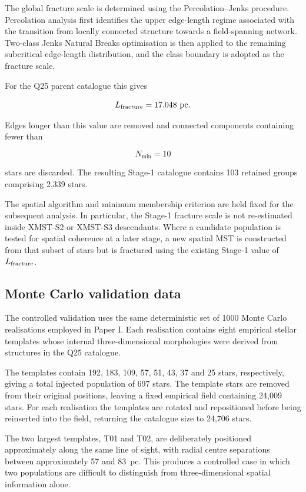 \documentclass[fleqn,usenatbib]{rasti}
\begin{document}
The global fracture scale is determined using the Percolation--Jenks
procedure. Percolation analysis first identifies the upper edge-length
regime associated with the transition from locally connected structure
towards a field-spanning network. Two-class Jenks Natural Breaks
optimisation is then applied to the remaining subcritical edge-length
distribution, and the class boundary is adopted as the fracture scale.

For the Q25 parent catalogue this gives

\[
L_{\rm fracture}=17.048~{\rm pc}.
\]

Edges longer than this value are removed and connected components containing
fewer than

\[
N_{\min}=10
\]

stars are discarded. The resulting Stage-1 catalogue contains 103 retained
groups comprising 2,339 stars.

The spatial algorithm and minimum membership criterion are held fixed for
the subsequent analysis. In particular, the Stage-1 fracture scale is not
re-estimated inside XMST-S2 or XMST-S3 descendants. Where a candidate
population is tested for spatial coherence at a later stage, a new spatial
MST is constructed from that subset of stars but is fractured using the
existing Stage-1 value of $L_{\rm fracture}$.


\subsection{Monte Carlo validation data}

The controlled validation uses the same deterministic set of 1000 Monte
Carlo realisations employed in Paper I. Each realisation contains eight
empirical stellar templates whose internal three-dimensional morphologies
were derived from structures in the Q25 catalogue.

The templates contain 192, 183, 109, 57, 51, 43, 37 and 25 stars,
respectively, giving a total injected population of 697 stars. The template
stars are removed from their original positions, leaving a fixed empirical
field containing 24,009 stars. For each realisation the templates are
rotated and repositioned before being reinserted into the field, returning
the catalogue size to 24,706 stars.

The two largest templates, T01 and T02, are deliberately positioned
approximately along the same line of sight, with radial centre separations
between approximately 57 and 83~pc. This produces a controlled case in
which two populations are difficult to distinguish from three-dimensional
spatial information alone.
\end{document}
